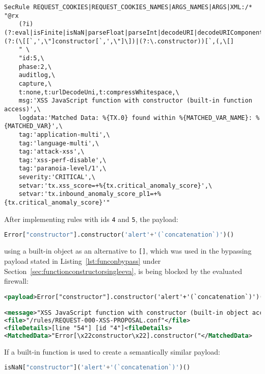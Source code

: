 \begin{lstlisting}[style=basicStyle, caption=rule proposal to block usage of function constructor via built-in functions, label={lst:constructorsruleproposal4}]
SecRule REQUEST_COOKIES|REQUEST_COOKIES_NAMES|ARGS_NAMES|ARGS|XML:/* "@rx 
    (?i)(?:eval|isFinite|isNaN|parseFloat|parseInt|decodeURI|decodeURIComponent|encodeURI|encodeURIComponent|escape|unescape)(?:(\[[`,',\"]constructor[`,',\"]\])|(?:\.constructor))[`,(,\[]
    " \
    "id:5,\
    phase:2,\
    auditlog,\
    capture,\
    t:none,t:urlDecodeUni,t:compressWhitespace,\
    msg:'XSS JavaScript function with constructor (built-in function access)',\
    logdata:'Matched Data: %{TX.0} found within %{MATCHED_VAR_NAME}: %{MATCHED_VAR}',\
    tag:'application-multi',\
    tag:'language-multi',\
    tag:'attack-xss',\
    tag:'xss-perf-disable',\
    tag:'paranoia-level/1',\
    severity:'CRITICAL',\
    setvar:'tx.xss_score=+%{tx.critical_anomaly_score}',\
    setvar:'tx.inbound_anomaly_score_pl1=+%{tx.critical_anomaly_score}'"
\end{lstlisting}

After implementing rules with ids \verb|4| and \verb|5|, the payload:

\begin{lstlisting}[style=basicStyle, language=Python]
Error["constructor"].constructor('alert'+'(`concatenation`)')()
\end{lstlisting}

using a built-in object as an alternative to \verb|[]|, which was used in the bypassing payload stated in Listing~\ref{lst:funconbypass} under Section~\ref{sec:functionconstructorsingleeva}, is being blocked by the evaluated firewall:

\begin{lstlisting}[style=ruleStyle, language=XML, caption=function constructor bypass payload using an alternative built-in object blocked, label={lst:constructorsblockedbio}]
<payload>Error["constructor"].constructor('alert'+'(`concatenation`)')()</payload>

<message>"XSS JavaScript function with constructor (built-in object access)"</message>
<file>"/rules/REQUEST-000-XSS-PROPOSAL.conf"</file>
<fileDetails>[line "54"] [id "4"]<fileDetails>
<MatchedData>"Error[\x22constructor\x22].constructor("</MatchedData>
\end{lstlisting}

If a built-in function is used to create a semantically similar payload: 

\begin{lstlisting}[style=basicStyle, language=Python]
isNaN["constructor"]('alert'+'(`concatenation`)')()
\end{lstlisting}

